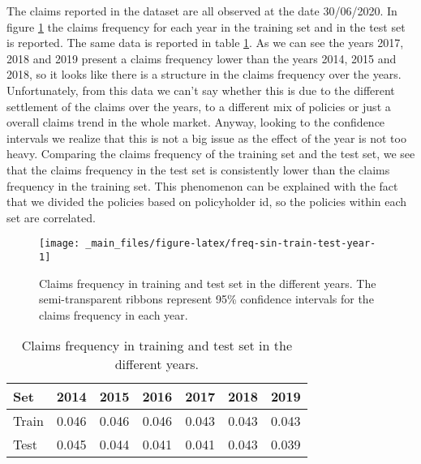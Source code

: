 \documentclass[a4paper, nobind]{templates/ociamthesis}
\theoremstyle{definition}
\theoremstyle{definition}
\theoremstyle{definition}
\theoremstyle{remark}
\begin{document}
The claims reported in the dataset are all observed at the date 30/06/2020. In figure \ref{fig:freq-sin-train-test-year} the claims frequency for each year in the training set and in the test set is reported. The same data is reported in table \ref{tab:freq-sin-train-test-year}. As we can see the years 2017, 2018 and 2019 present a claims frequency lower than the years 2014, 2015 and 2018, so it looks like there is a structure in the claims frequency over the years. Unfortunately, from this data we can't say whether this is due to the different settlement of the claims over the years, to a different mix of policies or just a overall claims trend in the whole market. Anyway, looking to the confidence intervals we realize that this is not a big issue as the effect of the year is not too heavy. Comparing the claims frequency of the training set and the test set, we see that the claims frequency in the test set is consistently lower than the claims frequency in the training set. This phenomenon can be explained with the fact that we divided the policies based on policyholder id, so the policies within each set are correlated.





\begin{figure}[!hbtp]

{\centering \texttt{[image: \_main\_files/figure-latex/freq-sin-train-test-year-1]} 

}

\caption[Claims frequency in training and test set in the different years.]{Claims frequency in training and test set in the different years. The semi-transparent ribbons represent 95\% confidence intervals for the claims frequency in each year.}\label{fig:freq-sin-train-test-year}
\end{figure}

\begin{table}[!h]

\caption{\label{tab:freq-sin-train-test-year}Claims frequency in training and test set in the different years.}
\centering
\begin{tabular}[t]{lcccccc}
\toprule
\textbf{Set} & \textbf{2014} & \textbf{2015} & \textbf{2016} & \textbf{2017} & \textbf{2018} & \textbf{2019}\\
\toprule\addlinespace
Train & 0.046 & 0.046 & 0.046 & 0.043 & 0.043 & 0.043\\
\addlinespace\hline\addlinespace
Test & 0.045 & 0.044 & 0.041 & 0.041 & 0.043 & 0.039\\
\bottomrule
\end{tabular}
\end{table}
\end{document}
